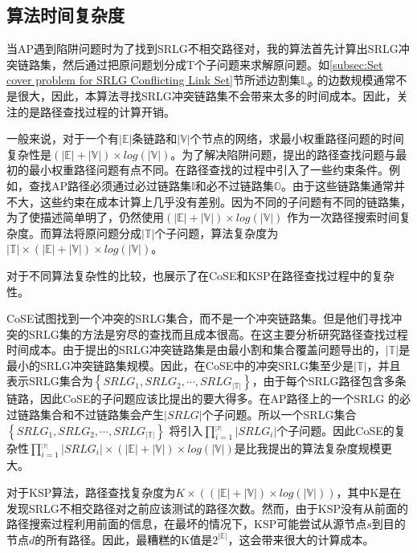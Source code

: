\subsection{算法时间复杂度}
\label{subsec:Complexity analysis}
当AP遇到陷阱问题时为了找到SRLG不相交路径对，我的算法首先计算出SRLG冲突链路集，然后通过把原问题划分成T个子问题来求解原问题。如\ref{subsec:Set cover problem for SRLG Conflicting Link Set}节所述边割集$\mathbb{L}_{\Phi}$ 的边数规模通常不是很大，因此，本算法寻找SRLG冲突链路集不会带来太多的时间成本。因此，关注的是路径查找过程的计算开销。

一般来说，对于一个有$|\mathbb{E}|$条链路和$|\mathbb{V}|$个节点的网络，求最小权重路径问题的时间复杂性是$(|\mathbb{E}|+|\mathbb{V}|)\times log(|\mathbb{V}|)$。为了解决陷阱问题，提出的路径查找问题与最初的最小权重路径问题有点不同。在路径查找的过程中引入了一些约束条件。例如，查找AP路径必须通过必过链路集$\mathbb{I}$和必不过链路集$\mathbb{O}$。由于这些链路集通常并不大，这些约束在成本计算上几乎没有差别。因为不同的子问题有不同的链路集，为了使描述简单明了，仍然使用$(|\mathbb{E}|+|\mathbb{V}|)\times log(|\mathbb{V}|)$ 作为一次路径搜索时间复杂度。而算法将原问题分成$|\mathbb{T}|$个子问题，算法复杂度为$|\mathbb{T}|\times(|\mathbb{E}|+|\mathbb{V}|)\times log(|\mathbb{V}|)$。


对于不同算法复杂性的比较，也展示了在CoSE\cite{rostami2007cose}和KSP\cite{eppstein1998finding}在路径查找过程中的复杂性。

CoSE试图找到一个冲突的SRLG集合，而不是一个冲突链路集。但是他们寻找冲突的SRLG集的方法是穷尽的查找而且成本很高。在这主要分析研究路径查找过程时间成本。由于提出的SRLG冲突链路集是由最小割和集合覆盖问题导出的，$|\mathbb{T}|$是最小的SRLG冲突链路集规模。因此，在CoSE中的冲突SRLG集至少是$|\mathbb{T}|$，并且表示SRLG集合为$\left\{ {SRL{G_1},SRL{G_2}, \cdots ,SRL{G_{|\mathbb{T}|}}} \right\}$，由于每个SRLG路径包含多条链路，因此CoSE的子问题应该比提出的要大得多。在AP路径上的一个SRLG 的必过链路集合和不过链路集会产生$|SRLG|$个子问题。所以一个SRLG集合$\left\{ {SRL{G_1},SRL{G_2}, \cdots ,SRL{G_{|\mathbb{T}|}}} \right\}$ 将引入$\prod\limits_{i = 1}^{_{\left| T \right|}} {\left| {SRL{G_i}} \right|}$个子问题。因此CoSE的复杂性$\prod\limits_{i = 1}^{_{|\mathbb{T}|}} {\left| {SRL{G_i}} \right|}\times (|\mathbb{E}|+|\mathbb{V}|)\times log(|\mathbb{V}|)$是比我提出的算法复杂度规模更大。

对于KSP算法\cite{eppstein1998finding}，路径查找复杂度为$K\times ((|\mathbb{E}|+|\mathbb{V}|)\times log(|\mathbb{V}|))$，其中K是在发现SRLG不相交路径对之前应该测试的路径次数。然而，由于KSP没有从前面的路径搜索过程利用前面的信息，在最坏的情况下，KSP可能尝试从源节点$s$到目的节点$d$的所有路径。因此，最糟糕的K值是$2^{|\mathbb{E}|}$，这会带来很大的计算成本。

